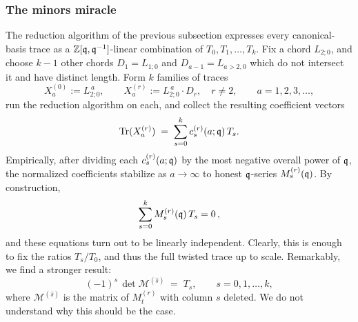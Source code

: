 \documentclass[12pt]{amsart}
\begin{document}
\subsubsection{The minors miracle}
The reduction algorithm of the previous subsection expresses every
canonical-basis trace as a $\mathbb{Z}[\mathfrak{q}, \mathfrak{q}^{-1}]$-linear combination of
$T_0, T_1, \ldots, T_k$.  Fix a chord $L_{2;0}$, and choose $k-1$
other chords $D_1 = L_{1;0}$ and $D_{a-1}=L_{a>2,0}$ which do not intersect it and have distinct length. Form $k$
families of traces
\begin{equation}
  X^{(0)}_a := L_{2;0}^{\,a},
  \qquad
  X^{(r)}_a := L_{2;0}^{\,a}\cdot D_r, \quad r \neq 2,
  \qquad a = 1, 2, 3, \ldots,
\end{equation}
run the reduction algorithm on each, and collect the resulting
coefficient vectors
\begin{equation}
  \operatorname{Tr}(X^{(r)}_a) \;=\; \sum_{s = 0}^{k} c^{(r)}_s(a;\mathfrak{q})\, T_s.
\end{equation}
Empirically, after dividing each $c^{(r)}_s(a;\mathfrak{q})$ by the most negative overall power of $\mathfrak{q}$, the normalized coefficients stabilize as
$a \to \infty$ to honest $\mathfrak{q}$-series $M^{(r)}_s(\mathfrak{q})$. By construction, 
\begin{equation}
  \sum_{s = 0}^{k} M^{(r)}_s(\mathfrak{q})\, T_s = 0 \, ,
\end{equation}
and these equations turn out to be linearly independent. Clearly, this is enough to fix the ratios $T_s/T_0$,
and thus the full twisted trace up to scale. Remarkably, we find a stronger result: 
\begin{equation}
  (-1)^{s}\, \det \mathcal M^{(\hat s)} \;=\; T_s,
  \qquad s = 0, 1, \ldots, k,
\end{equation}
where $\mathcal M^{(\hat s)}$ is the matrix of $M^{(r)}_t$ with column $s$ deleted. We do not understand why this should be the case. 




\end{document}
